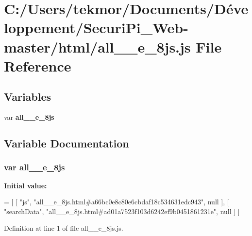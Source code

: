 \section{C\+:/\+Users/tekmor/\+Documents/\+Développement/\+Securi\+Pi\+\_\+\+Web-\/master/html/all\+\_\+\+\_\+e\+\_\+8js.js File Reference}
\label{all____e__8js_8js}
\subsection*{Variables}
\begin{DoxyCompactItemize}
\item 
var {\bf all\+\_\+\+\_\+e\+\_\+8js}
\end{DoxyCompactItemize}


\subsection{Variable Documentation}
\subsubsection[{all\+\_\+\+\_\+e\+\_\+8js}]{\setlength{\rightskip}{0pt plus 5cm}var all\+\_\+\+\_\+e\+\_\+8js}\label{all____e__8js_8js_ab9a8c3177d63c3be23773e886360286c}
{\bfseries Initial value\+:}
\begin{DoxyCode}
=
[
    [ \textcolor{stringliteral}{"js"}, \textcolor{stringliteral}{"all\_\_e\_8js.html#a66bc0e8c80e6cbdaf18c534631edc943"}, null ],
    [ \textcolor{stringliteral}{"searchData"}, \textcolor{stringliteral}{"all\_\_e\_8js.html#ad01a7523f103d6242ef9b0451861231e"}, null ]
]
\end{DoxyCode}


Definition at line 1 of file all\+\_\+\+\_\+e\+\_\+8js.\+js.

